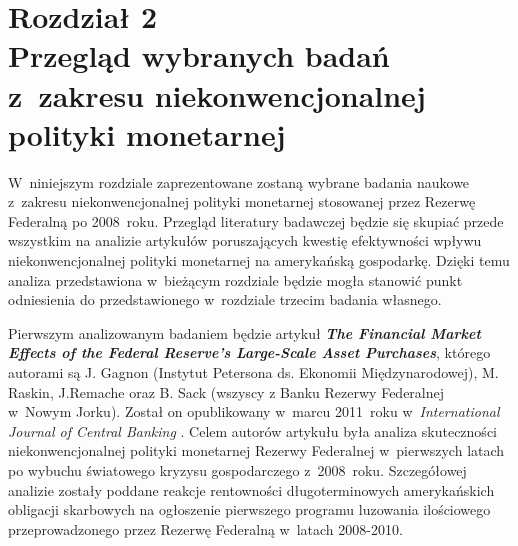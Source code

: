 \newpage
\chapter*{Rozdział 2 \\ \vspace{1cm} \Large{Przegląd wybranych badań z~zakresu niekonwencjonalnej polityki monetarnej}}
 
W~niniejszym rozdziale zaprezentowane zostaną wybrane badania naukowe z~zakresu niekonwencjonalnej polityki monetarnej stosowanej przez Rezerwę Federalną po 2008~roku. Przegląd literatury badawczej będzie się skupiać przede wszystkim na analizie artykułów poruszających kwestię efektywności wpływu niekonwencjonalnej polityki monetarnej na amerykańską gospodarkę. Dzięki temu analiza przedstawiona w~bieżącym rozdziale będzie mogła stanowić punkt odniesienia do przedstawionego w~rozdziale trzecim badania własnego.

Pierwszym analizowanym badaniem będzie artykuł \textbf{\textit{The Financial Market Effects of the Federal Reserve’s Large-Scale Asset Purchases}}, którego autorami są J. Gagnon (Instytut Petersona ds. Ekonomii Międzynarodowej), M. Raskin, J.Remache oraz B. Sack (wszyscy  z Banku Rezerwy Federalnej w~Nowym Jorku). Został on opublikowany w~marcu 2011~roku w~\textit{International Journal of Central Banking} \cite{gagnon34}. Celem autorów artykułu była analiza skuteczności niekonwencjonalnej polityki monetarnej Rezerwy Federalnej w~pierwszych latach po wybuchu światowego kryzysu gospodarczego z~2008~roku. Szczegółowej analizie zostały poddane reakcje rentowności długoterminowych amerykańskich obligacji skarbowych na ogłoszenie pierwszego programu luzowania ilościowego przeprowadzonego przez Rezerwę Federalną w~latach 2008-2010. 

